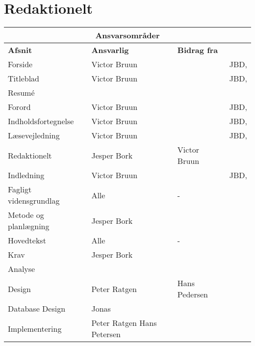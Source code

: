 \clearpage
\section{Redaktionelt}

\begin{table}[h!]
\centering
\label{tab:1}
    \begin{tabular}{|p{45mm}|p{30mm}|p{30mm}|p{35mm}|} \hline
    \multicolumn{4}{|c|}{\textbf{Ansvarsområder}} \\ \hline
        \textbf{Afsnit}        & \textbf{Ansvarlig} & \textbf{Bidrag fra} &\textbf{\raggedright Kontrolleret af}  \\\hline
        Forside                & Victor Bruun     &          & JBD, \\ \hline
        Titleblad              & Victor Bruun     &          & JBD, \\ \hline
        Resumé                 &                  &          &  \\ \hline
        Forord                 & Victor Bruun     &          & JBD,  \\ \hline
        Indholdsfortegnelse    & Victor Bruun     &          & JBD, \\ \hline
        Læsevejledning         & Victor Bruun     &          & JBD,  \\ \hline
        Redaktionelt           & Jesper Bork      & Victor Bruun         &  \\ \hline
        Indledning             & Victor Bruun     &          & JBD, \\ \hline
        Fagligt vidensgrundlag & Alle             & -        &  \\ \hline
        Metode og planlægning  & Jesper Bork      &          &  \\ \hline
        Hovedtekst             & Alle             & -        &  \\ \hline
        Krav                   & Jesper Bork      &          &  \\ \hline
        Analyse                &                  &              &  \\ \hline
        Design                 & Peter Ratgen     & Hans Pedersen&  \\ \hline
        Database Design        & Jonas            &          &  \\ \hline
        Implementering         & Peter Ratgen \newline 
                                 Hans Petersen \newline

\end{tabular}
\end{table}
